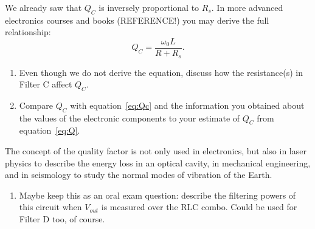 \documentclass{article}
\begin{document}
We already saw that $Q_C$ is inversely proportional to $R_s$. In
more advanced electronics courses and books (REFERENCE!) you may
derive the full relationship:
\begin{equation}
  Q_C=\frac{\omega_0 L}{R + R_s}.
  \label{eq:Qc}
\end{equation}
\begin{enumerate}[resume]
\item Even though we do not derive the equation, discuss how the
  resistance(s) in Filter C affect $Q_C$.
\item Compare $Q_C$ with equation~\ref{eq:Qc} and the information you
  obtained about the values of the electronic components to your
  estimate of $Q_C$ from equation~\ref{eq:Q}.
\end{enumerate}

The concept of the quality factor is not only used in electronics, but
also in laser physics to describe the energy loss in an optical
cavity, in mechanical engineering, and in seismology to study the
normal modes of vibration of the Earth.

\begin{enumerate}[resume]
  
\item Maybe keep this as an oral exam question: describe the filtering
  powers of this circuit when $V_{out}$ is measured over the RLC
  combo. Could be used for Filter D too, of course.
\end{enumerate}
\end{document}
